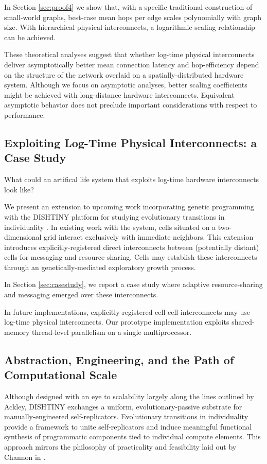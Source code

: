 In Section \ref{sec:proof4} we show that, with a specific traditional construction of small-world graphs, best-case mean hops per edge scales polynomially with graph size.
With hierarchical physical interconnects, a logarithmic scaling relationship can be achieved.

These theoretical analyses suggest that whether log-time physical interconnects deliver asymptotically better mean connection latency and hop-efficiency depend on the structure of the network overlaid on a spatially-distributed hardware system.
Although we focus on asymptotic analyses, better scaling coefficients might be achieved with long-distance hardware interconnects.
Equivalent asymptotic behavior does not preclude important considerations with respect to performance.

\subsection{Exploiting Log-Time Physical Interconnects: a Case Study}

What could an artifical life system that exploits log-time hardware interconnects look like?

We present an extension to upcoming work incorporating genetic programming with the DISHTINY platform for studying evolutionary transitions in individuality \citep{moreno2019toward}.
In existing work with the system, cells situated on a two-dimensional grid interact exclusively with immediate neighbors.
This extension introduces explicitly-registered direct interconnects between (potentially distant) cells for messaging and resource-sharing.
Cells may establish these interconnects through an genetically-mediated exploratory growth process.

In Section \ref{sec:casestudy}, we report a case study where adaptive resource-sharing and messaging emerged over these interconnects.

In future implementations, explicitly-registered cell-cell interconnects may  use log-time physical interconnects.
Our prototype implementation exploits shared-memory thread-level parallelism on a single multiprocessor.

\subsection{Abstraction, Engineering, and the Path of Computational Scale}

Although designed with an eye to scalability largely along the lines outlined by Ackley, DISHTINY exchanges a uniform, evolutionary-passive substrate for manually-engineered self-replicators.
Evolutionary transitions in individuality provide a framework to unite self-replicators and induce meaningful functional synthesis of programmatic components tied to individual compute elements.
This approach mirrors the philosophy of practicality and feasibility laid out by Channon in \citep{channon2019maximum}.


